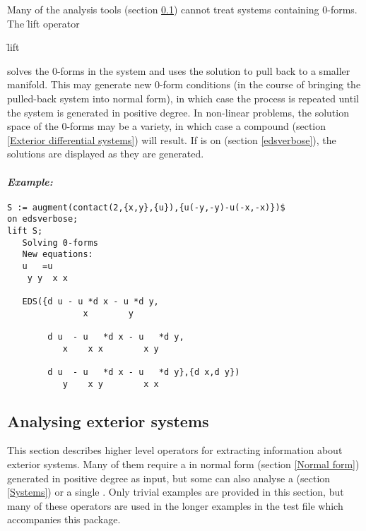 \hypertarget{operator:LIFT}{}
Many of the analysis tools (section \ref{Analysing exterior systems})
cannot treat systems containing 0-forms. The \f{lift} operator
\begin{syntax}
	\f{lift} 
\end{syntax}
solves the $0$-forms in the system and uses the solution to pull back to a
smaller manifold. This may generate new $0$-form conditions (in the course of
bringing the pulled-back system into normal form), in which case the
process is repeated until the system is generated in positive degree. In
non-linear problems, the solution space of the 0-forms may be a variety, in
which case a compound  (section \ref{Exterior differential
systems}) will result. If  is on (section \ref{edsverbose}),
the solutions are displayed as they are generated.

\paragraph{\textit{Example:}}
\begin{verbatim}
S := augment(contact(2,{x,y},{u}),{u(-y,-y)-u(-x,-x)})$
on edsverbose;
lift S;
   Solving 0-forms
   New equations:
   u   =u
    y y  x x

   EDS({d u - u *d x - u *d y,
               x        y

        d u  - u   *d x - u   *d y,
           x    x x        x y

        d u  - u   *d x - u   *d y},{d x,d y})
           y    x y        x x
\end{verbatim}



\subsection{Analysing exterior systems}
\label{Analysing exterior systems}

This section describes higher level operators for extracting information
about exterior systems. Many of them require a  in normal form
(section \ref{Normal form}) generated in positive degree as input, but some
can also analyse a  (section \ref{Systems}) or a single
. Only trivial examples are provided in this section, but many
of these operators are used in the longer examples in the test file which
accompanies this package.


